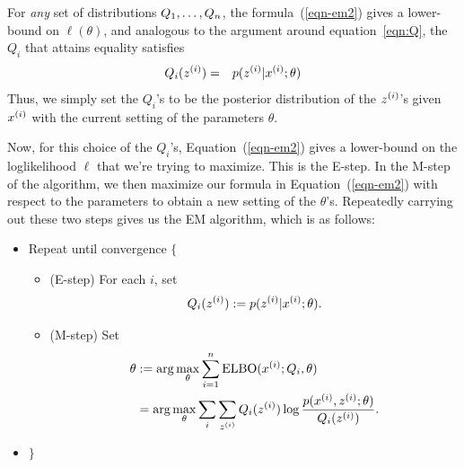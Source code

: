 \documentclass{article}
\begin{document}
For \emph{any} set of distributions $Q_1,\dots ,Q_{{n}}$, the formula~(\ref{eqn-em2})
gives a lower-bound on $\ell(\theta)$, and analogous to the argument around equation~\eqref{eqn:Q}, the $Q_i$ that attains equality satisfies
\begin{eqnarray*}
Q_i(\zsi)%
&=& p(\zsi | \xsi; \theta)
\end{eqnarray*}
Thus, we simply set the $Q_i$'s to be the posterior distribution of
the ${z^{(i)}}$'s given ${x^{(i)}}$ with the current setting of the parameters $\theta$.

Now, for this choice of the $Q_i$'s, Equation~(\ref{eqn-em2}) gives
a lower-bound on the loglikelihood $\ell$ that we're trying to maximize.
This is the E-step.  In the M-step of the algorithm, we then maximize
our formula in Equation~(\ref{eqn-em2}) with respect to
the parameters to obtain a new setting of the $\theta$'s.  Repeatedly
carrying out these two steps gives us the EM algorithm, which is as follows:
\begin{itemize}
\item[] Repeat until convergence $\{$
\begin{itemize}
\item[] (E-step) For each $i$, set
\[
Q_i({z^{(i)}}) := p({z^{(i)}} | {x^{(i)}}; \theta).
\]
\item[] (M-step) Set
\begin{align}
\theta &:= \arg \max_\theta \sum_{i=1}^{n} \textup{ELBO}({x^{(i)}}; Q_i,\theta) \nonumber\\
& = \arg \max_\theta \sum_i \sum_{z^{(i)}} Q_i({z^{(i)}}) \log \frac{p({x^{(i)}},{z^{(i)}};\theta)}{Q_i({z^{(i)}})}.
\end{align}
\end{itemize}
\item[] $\}$
\end{itemize}
\end{document}

